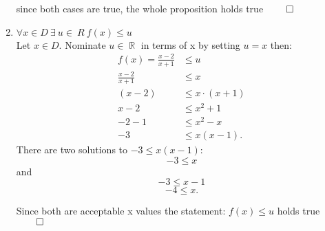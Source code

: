 \documentclass[11pt,twoside]{amsart}
\DeclareMathOperator*{\R}{\mathbb{R}} \DeclareMathOperator*{\N}{\mathbb{N}} \DeclareMathOperator*{\Q}{\mathbb{Q}} \DeclareMathOperator*{\Z}{\mathbb{Z}} \DeclareMathOperator*{\E}{\mathbb{E}} \DeclareMathOperator*{\C}{\mathbb{C}} \DeclareMathOperator*{\A}{\mathbb{A}}
\theoremstyle{definition}
\begin{document}
\begin{enumerate}[label= 1.\arabic*), itemsep=0.4cm]
since both cases are true, the whole proposition holds true $\qed$
  \newpage
\item %
    $\forall x \in D \ \exists \ u \in \    R \ f(x) \leq u$ \\
  Let $x \in D$. Nominate $u \in \R$ in terms of x by setting $u = x$ then:
    \begin{align*}
      f(x) = \frac{x-2}{x+1}  &\leq u\\
              \frac{x-2}{x+1} &\leq x \\
                         (x-2)&\leq x \cdot (x+1) \\
                         x-2 &\leq x^2 +1 \\
                         -2-1 &\leq x^2 -x \\
                         -3 &\leq x(x-1).
    \end{align*}
    There are two solutions to $-3 \leq x(x-1)$:
    $$-3 \leq x$$
    and 
    $$-3 \leq x-1 $$
     $$-4 \leq x.$$ 

     Since both are acceptable x values the statement: $f(x) \leq u$ holds true $\qed$


\end{enumerate}
\end{document}
